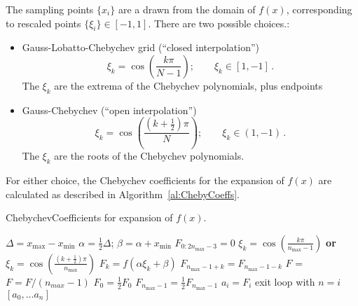 The sampling points $\{x_i\}$ are a drawn from the domain of $f(x)$,
corresponding to rescaled points $\{\xi_i\} \in [-1,1]$. There are two possible
choices.:
\begin{itemize}
  \item Gauss-Lobatto-Chebychev grid
        (``closed interpolation'')
  \begin{equation}
    \xi_k = \cos\left( \frac{k \pi}{N-1}
                \right); \qquad \xi_k \in [1, -1]\,.
    \label{eq:gauss_lobatto}
  \end{equation}
  The $\xi_k$ are the extrema of the Chebychev polynomials, plus
  endpoints
  \item Gauss-Chebychev (``open interpolation'')
  \begin{equation}
    \xi_k = \cos\left( \frac{\left(k + \frac{1}{2}\right) \pi}{N}
                \right); \qquad \xi_k \in (1, -1)\,.
    \label{eq:gauss_cheby}
  \end{equation}
  The $\xi_k$ are the roots of the Chebychev polynomials.
\end{itemize}
For either choice, the Chebychev coefficients for the expansion of $f(x)$ are
calculated as described in Algorithm~\ref{al:ChebyCoeffs}.

\begin{algorithm}
  \caption{{\sc ChebychevCoefficients}
  for expansion of $f(x)$.
  \label{al:ChebyCoeffs}
  }
  \begin{algorithmic}[1]
    \Statex
    \Statex
     \State $\Delta = x_{\max} - x_{\min}$
     \State $\alpha = \frac{1}{2} \Delta$;
            $\beta = \alpha + x_{\min}$
     \State $F_{0:2 n_{\max}-3} = 0$
        \State $\xi_{k} = \cos\left( \frac{k \pi}{n_{\max} - 1} \right)$
               {\bf or}
               $\xi_{k} = \cos\left( \frac{\left(k + \frac{1}{2} \right) \pi}
                                        {n_{\max}}
                          \right)$
        \State $F_k = f(\alpha \xi_{k} + \beta)$
     \EndFor
      
        \State $F_{n_{\max}-1+k} = F_{n_{\max}-1-k}$
     \EndFor
     \State $F$ = 
     \State $F = F / (n_{max}-1)$
     \State $F_0 = \frac{1}{2} F_0$
     \State $F_{n_{\max}-1} = \frac{1}{2} F_{n_{\max}-1}$
       \State $a_i = F_i$
        exit loop with $n=i$
     \EndFor
     \State \Return $[a_0, \dots a_n]$
   \EndProcedure
  \end{algorithmic}
\end{algorithm}

